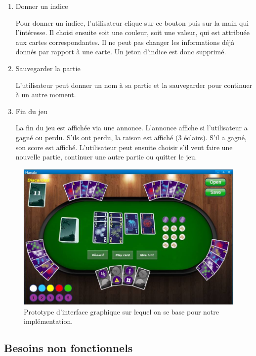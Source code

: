 \documentclass{article}
\begin{document}
\begin{enumerate}
\item  {Donner un indice}

{\normalfont Pour donner un indice, l’utilisateur clique sur ce bouton puis sur la main qui l'intéresse. Il choisi ensuite soit une couleur, soit une valeur, qui est attribuée aux cartes correspondantes. Il ne peut pas changer les informations déjà donnés par rapport à une carte. Un jeton d’indice est donc supprimé.}

\item  {Sauvegarder la partie}

{\normalfont L’utilisateur peut donner un nom à sa partie et la sauvegarder pour continuer à un autre moment.}

\item  {Fin du jeu}

{\normalfont La fin du jeu est affichée via une annonce. L’annonce affiche si l'utilisateur a gagné ou perdu. S’ils ont perdu, la raison est affiché (3 éclairs). S’il a gagné, son score est affiché. L’utilisateur peut ensuite choisir s’il veut faire une nouvelle partie, continuer une autre partie ou quitter le jeu.\\}

\end{enumerate}


\begin{figure}[h]
\centering
\includegraphics[scale = 0.4]{ihm.jpg}
\caption{Prototype d'interface graphique sur lequel on se base pour notre implémentation.}
\end{figure}

\subsection{Besoins non fonctionnels}
\end{document}

